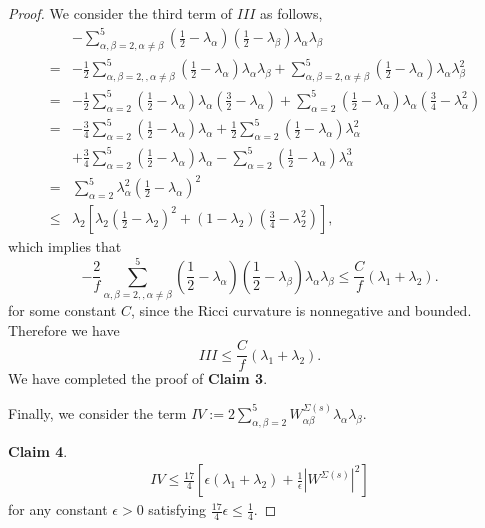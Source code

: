 \documentclass[12pt]{amsart}
\newcommand{\ban}{\begin{eqnarray*}}
\newcommand{\ean}{\end{eqnarray*}}
\begin{document}
\begin{proof}
		We consider the third term of $III$ as follows,
		\ban
		&&-\sum_{\alpha,\beta=2,\alpha\neq\beta}^5({\frac{1}{2}}-\lambda_{\alpha})({\frac{1}{2}}-\lambda_{\beta})\lambda_\alpha\lambda_\beta\\
		&=&-\frac{1}{2}\sum_{\alpha,\beta=2,,\alpha\neq\beta}^5({\frac{1}{2}}-\lambda_{\alpha})\lambda_\alpha\lambda_\beta
		+\sum_{\alpha,\beta=2,\alpha\neq\beta}^5({\frac{1}{2}}-\lambda_{\alpha})\lambda_\alpha\lambda_\beta^2\\
		&=&-\frac{1}{2}\sum_{\alpha=2}^5({\frac{1}{2}}-\lambda_{\alpha})\lambda_\alpha(\frac{3}{2}-\lambda_\alpha)
		+\sum_{\alpha=2}^5({\frac{1}{2}}-\lambda_{\alpha})\lambda_\alpha(\frac{3}{4}-\lambda_\alpha^2)\\
		&=&-\frac{3}{4}\sum_{\alpha=2}^5({\frac{1}{2}}-\lambda_{\alpha})\lambda_\alpha
		+\frac{1}{2}\sum_{\alpha=2}^5({\frac{1}{2}}-\lambda_{\alpha})\lambda_\alpha^2\\
		&&+\frac{3}{4}\sum_{\alpha=2}^5({\frac{1}{2}}-\lambda_{\alpha})\lambda_\alpha
		-\sum_{\alpha=2}^5({\frac{1}{2}}-\lambda_{\alpha})\lambda_\alpha^3\\
		&=&\sum_{\alpha=2}^5\lambda_\alpha^2({\frac{1}{2}}-\lambda_{\alpha})^2\\
		&\leq&\lambda_2\left[\lambda_2({\frac{1}{2}}-\lambda_2)^2+(1-\lambda_2)(\frac{3}{4}-\lambda_2^2)\right],
		\ean
		which implies that
		\[
		 -\frac{2}{f}\sum_{\alpha,\beta=2,,\alpha\neq\beta}^5({\frac{1}{2}}-\lambda_{\alpha})({\frac{1}{2}}-\lambda_{\beta})\lambda_\alpha\lambda_\beta
		\leq\frac{C}{f}(\lambda_{1}+\lambda_{2}).
		\]
		for some constant $C$, since the Ricci curvature is nonnegative and bounded. Therefore we have
		\[
		III\leq\frac{C}{f}(\lambda_{1}+\lambda_{2}).
		\]
		We have completed the proof of \textbf{Claim 3}.
		
		\smallskip
		Finally, we consider the term $IV:=2\sum_{\alpha,\beta=2}^5W^{\Sigma(s)}_{\alpha\beta}\lambda_\alpha\lambda_\beta$.
		
		\smallskip
		\textbf{Claim 4}.
		\ban
		IV\leq\frac{17}{4}\left[ \epsilon(\lambda_1+\lambda_2)+\frac{1}{\epsilon}|W^{\Sigma(s)}|^2\right]
		\ean
		for any constant $\epsilon>0$ satisfying $\frac{17}{4}\epsilon\leq\frac{1}{4}$.
		

\end{proof}
\end{document}

